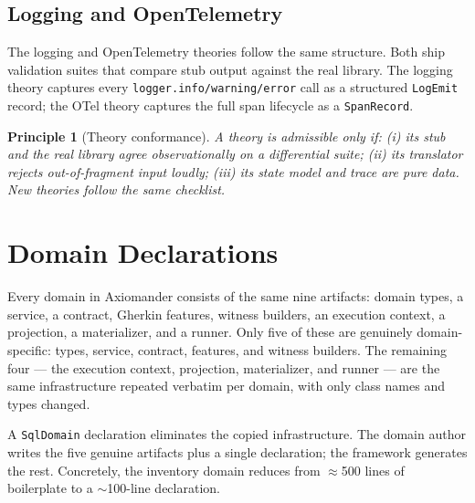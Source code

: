 \documentclass[11pt,a4paper]{article}
\newtheorem{principle}{Principle}
\begin{document}
\subsection{Logging and OpenTelemetry}

The logging and OpenTelemetry theories follow the same structure.  Both ship validation suites that compare stub
output against the real library.  The logging theory captures every
\texttt{logger.info/warning/error} call as a structured
\texttt{LogEmit} record; the OTel theory captures the full span
lifecycle as a \texttt{SpanRecord}.

\begin{principle}[Theory conformance]
A theory is admissible only if: (i) its stub and the real library
agree observationally on a differential suite; (ii) its translator
rejects out-of-fragment input loudly; (iii) its state model and trace
are pure data.  New theories follow the same checklist.
\end{principle}

\section{Domain Declarations}\label{sec:domains}

Every domain in Axiomander consists of the same nine artifacts:
domain types, a service, a contract, Gherkin features, witness
builders, an execution context, a projection, a materializer, and a
runner.  Only five of these are genuinely domain-specific: types,
service, contract, features, and witness builders.  The remaining four
--- the execution context, projection, materializer, and runner --- are
the same infrastructure repeated verbatim per domain, with only class
names and types changed.

A \texttt{SqlDomain} declaration eliminates the copied infrastructure.
The domain author writes the five genuine artifacts plus a single
declaration; the framework generates the rest.  Concretely, the
inventory domain reduces from $\approx$500 lines of boilerplate to
a $\sim$100-line declaration.
\end{document}

